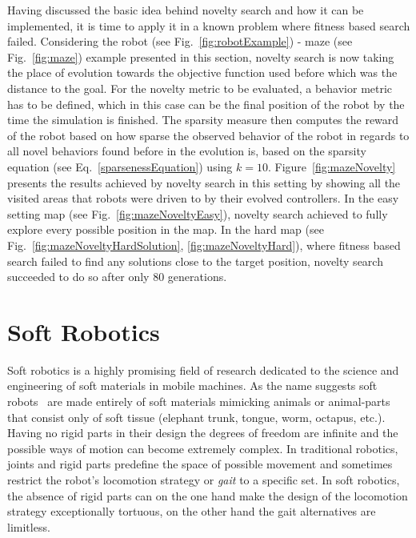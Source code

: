 Having discussed the basic idea behind novelty search and how it can be implemented, it is time to apply it in a known problem where fitness based search failed. Considering the robot (see Fig.~\ref{fig:robotExample}) - maze (see Fig.~\ref{fig:maze}) example presented in this section, novelty search is now taking the place of evolution towards the objective function used before which was the distance to the goal. For the novelty metric to be evaluated, a behavior metric has to be defined, which in this case can be the final position of the robot by the time the simulation is finished. The sparsity measure then computes the reward of the robot based on how sparse the observed behavior of the robot in regards to all novel behaviors found before in the evolution is, based on the sparsity equation (see Eq.~\ref{sparsenessEquation}) using $k = 10$. Figure~\ref{fig:mazeNovelty} presents the results achieved by novelty search in this setting by showing all the visited areas that robots were driven to by their evolved controllers. In the easy setting map (see Fig.~\ref{fig:mazeNoveltyEasy}), novelty search achieved to fully explore every possible position in the map. In the hard map (see Fig.~\ref{fig:mazeNoveltyHardSolution}, \ref{fig:mazeNoveltyHard}), where fitness based search failed to find any solutions close to the target position, novelty search succeeded to do so after only $80$ generations.



\section{Soft Robotics}
Soft robotics is a highly promising field of research dedicated to the science and engineering of soft materials in mobile machines. As the name suggests soft robots~\citep{trivedi2008soft, pfeifer2012challenges} are made entirely of soft materials mimicking animals or animal-parts that consist only of soft tissue (elephant trunk, tongue, worm, octapus, etc.). Having no rigid parts in their design the degrees of freedom are infinite and the possible ways of motion can become extremely complex. In traditional robotics, joints and rigid parts predefine the space of possible movement and sometimes restrict the robot's locomotion strategy or \emph{gait} to a specific set. In soft robotics, the absence of rigid parts can on the one hand make the design of the locomotion strategy exceptionally tortuous, on the other hand the gait alternatives are limitless.

